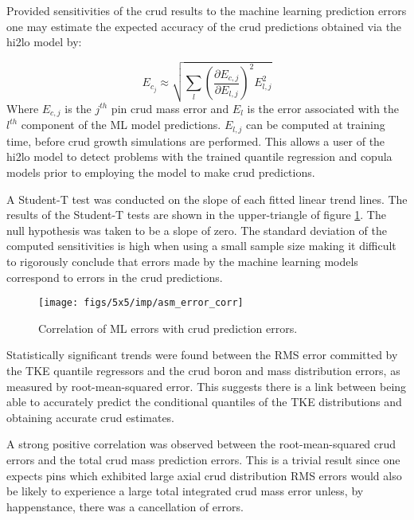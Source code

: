 Provided sensitivities of the crud results to the machine learning prediction errors one may estimate the expected accuracy of the crud predictions obtained via the hi2lo model by:

\begin{equation} \nonumber
    E_{c_j} \approx \sqrt{ \sum_l \left( \frac{\partial E_{c,j}}{\partial E_{l,j}}\right)^2 E_{l,j}^2 }
\end{equation}
Where $E_{c,j}$ is the $j^{th}$ pin crud mass error and $E_l$ is the error associated with the $l^{th}$ component of the ML model predictions.  $E_{l,j}$ can be computed at training time, before crud growth simulations are performed.
This allows a user of the hi2lo model to detect problems with the trained quantile regression and copula models prior to employing the model to make crud predictions.

A Student-T test was conducted on the slope of each fitted linear trend lines. The results of the Student-T tests are shown in the upper-triangle of figure \ref{fig:asmerrorcorr}.  The null hypothesis was taken to be a slope of zero.  The standard deviation of the computed sensitivities is high when using a small sample size making it difficult to rigorously conclude that errors made by the machine learning models correspond to errors in the crud predictions.

\begin{figure}[H]
    \centering
    \texttt{[image: figs/5x5/imp/asm\_error\_corr]}
    \caption{Correlation of ML errors with crud prediction errors.}
    \label{fig:asmerrorcorr}
\end{figure}

Statistically significant trends were found between the RMS error committed by the TKE quantile regressors and the crud boron and mass distribution errors, as measured by root-mean-squared error.  This suggests there is a link between being able to accurately predict the conditional quantiles of the TKE distributions and obtaining accurate crud estimates.

A strong positive correlation was observed between the root-mean-squared crud errors and the total crud mass prediction errors.  This is a trivial result since one expects pins which exhibited large axial crud distribution RMS errors would also be likely to experience a large total integrated crud mass error unless, by happenstance, there was a cancellation of errors.


